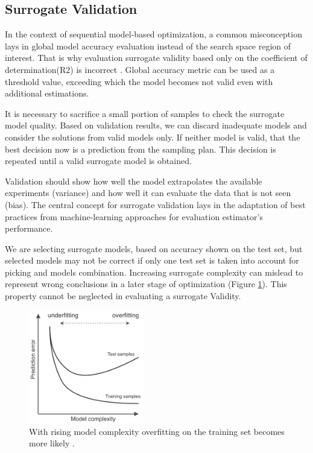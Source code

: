         \subsection{Surrogate Validation}
        In the context of sequential model-based optimization, a common misconception lays in global model accuracy evaluation instead of the search space region of interest. That is why evaluation surrogate validity based only on the coefficient of determination(R2) is incorrect \cite{nardi2019practical}. Global accuracy metric can be used as a threshold value, exceeding which the model becomes not valid even with additional estimations.

        It is necessary to sacrifice a small portion of samples to check the surrogate model quality. Based on validation results, we can discard inadequate models and consider the solutions from valid models only. If neither model is valid, that the best decision now is a prediction from the sampling plan. This decision is repeated until a valid surrogate model is obtained.

        Validation should show how well the model extrapolates the available experiments (variance) and how well it can evaluate the data that is not seen (bias). The central concept for surrogate validation lays in the adaptation of best practices from machine-learning approaches for evaluation estimator's performance. 

        We are selecting surrogate models, based on accuracy shown on the test set, but selected models may not be correct if only one test set is taken into account for picking and models combination. Increasing surrogate complexity can mislead to represent wrong conclusions in a later stage of optimization (Figure \ref{fig:cv_overfitting}). This property cannot be neglected in evaluating a surrogate Validity. 


        \begin{figure}[h!]
            \centering
            \includegraphics[width=5cm]{content/images/utility/cv_2x_test}
            \caption[surrogate validation: overfitting on the training set]{With rising model complexity overfitting on the training set becomes more likely \cite{HastieFT01, TobiasCV}.} 
            \label{fig:cv_overfitting}   
        \end{figure}

